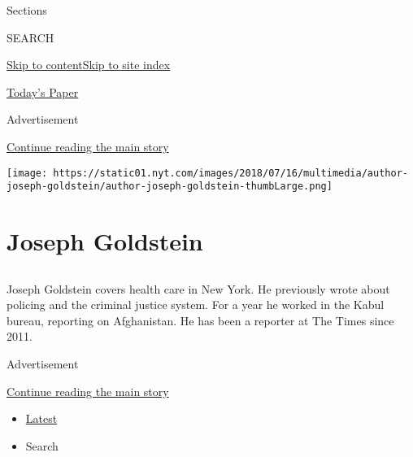 Sections

SEARCH

\protect\hyperlink{site-content}{Skip to
content}\protect\hyperlink{site-index}{Skip to site index}

\href{https://myaccount.nytimes.com/auth/login?response_type=cookie\&client_id=vi}{}

\href{https://www.nytimes.com/section/todayspaper}{Today's Paper}

Advertisement

\protect\hyperlink{after-top}{Continue reading the main story}

\texttt{[image: https://static01.nyt.com/images/2018/07/16/multimedia/author-joseph-goldstein/author-joseph-goldstein-thumbLarge.png]}

\hypertarget{joseph-goldstein}{%
\section{Joseph Goldstein}\label{joseph-goldstein}}

\subsection{}

Joseph Goldstein covers health care in New York. He previously wrote
about policing and the criminal justice system. For a year he worked in
the Kabul bureau, reporting on Afghanistan. He has been a reporter at
The Times since 2011.

Advertisement

\protect\hyperlink{after-mid1}{Continue reading the main story}

\begin{itemize}
\tightlist
\item
  \protect\hyperlink{stream-panel}{Latest}
\item
  Search
\end{itemize}

